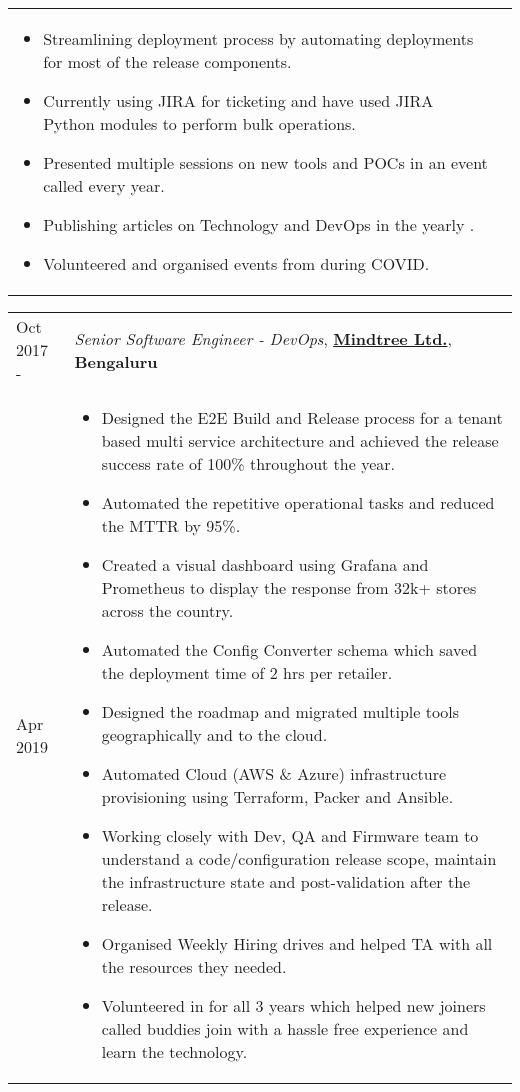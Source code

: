 \documentclass[11pt, a4paper]{article}
\begin{document}
\begin{tabular}{L{1.7cm}!{\color{gray}\vrule}l}
\begin{minipage}[t]{0.86\textwidth}
\begin{itemize}[leftmargin=*]
     \item Streamlining deployment process by automating deployments for most of the release components.
     \item Currently using JIRA for ticketing and have used JIRA Python modules to perform bulk operations.
    \item Presented multiple sessions on new tools and POCs in an event called  every year.
    \item Publishing articles on Technology and DevOps in the yearly .
    \item Volunteered and organised  events from  during COVID.
    \end{itemize}
  \end{minipage}
\end{tabular} 

\vspace{4mm}

\noindent\begin{tabular}{L{1.7cm}!{\color{gray}\vrule}l}
Oct 2017 -  & \textit{Senior Software Engineer - DevOps}, \textcolor{NavyBlue}{\textbf{\href{https://www.mindtree.com/about}{Mindtree Ltd.}}},  \textbf{Bengaluru} \\
Apr 2019 &
  \begin{minipage}[t]{0.86\textwidth}
    \begin{itemize}[leftmargin=*]
    \itemsep-0.5em 
    \item Designed the E2E Build and Release process for a tenant based multi service architecture and achieved the release success rate of 100\% throughout the year.
    \item Automated the repetitive operational tasks and reduced the MTTR by 95\%.
    \item Created a visual dashboard using Grafana and Prometheus to display the response from 32k+ stores across the country.
    \item Automated the Config Converter schema which saved the deployment time of 2 hrs per retailer.
    \item Designed the roadmap and migrated multiple tools geographically and to the cloud.
    \item Automated Cloud (AWS \& Azure) infrastructure provisioning using Terraform, Packer and Ansible.
    \item Working closely with Dev, QA and Firmware team to understand a code/configuration release scope,
maintain the infrastructure state and post-validation after the release.
    \item Organised Weekly Hiring drives and helped TA with all the resources they needed.
    \item Volunteered in  for all 3 years which helped new joiners called buddies join with a hassle free experience and learn the technology.
    \end{itemize}
  \end{minipage}
\end{tabular} 
\end{document}

